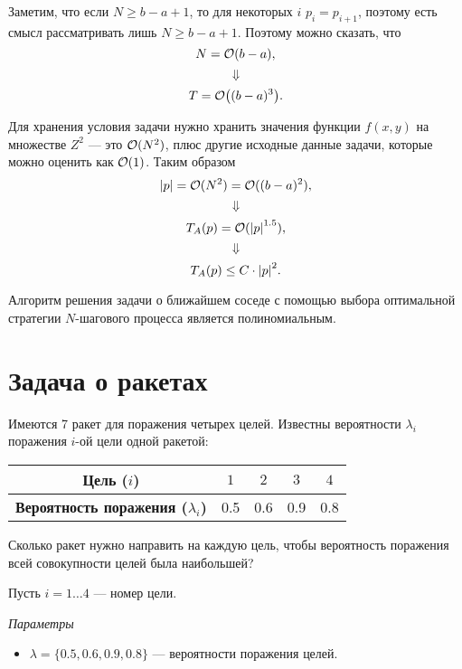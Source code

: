 Заметим, что если $N \ge b - a + 1$, то для некоторых $i$ $p_i = p_{i+1}$, поэтому есть смысл рассматривать лишь $N \ge b - a + 1$. Поэтому можно сказать, что
\[
N = \mathcal{O}(b - a),
\]
\[
\Downarrow
\]
\[
T = \mathcal{O}\big((b-a)^3\big). 
\]

Для хранения условия задачи нужно хранить значения функции $f(x, y)$ на множестве $Z^2$ --- это $\mathcal{O}(N^2)$, плюс другие исходные данные задачи, которые можно оценить как $\mathcal{O}(1)$. Таким образом
\[
\abs{p} = \mathcal{O}(N^2) = \mathcal{O}((b-a)^2),
\]
\[
\Downarrow
\]
\[
T_A(p) = \mathcal{O}(\abs{p}^{1.5}),
\]
\[
\Downarrow
\]
\[
T_A(p) \le C \cdot \abs{p}^2.
\]

\implication

Алгоритм решения задачи о ближайшем соседе с помощью выбора оптимальной стратегии $N$-шагового процесса является полиномиальным.

\section{Задача о ракетах}

\problem[о ракетах]\label{pr:rockets}

Имеются 7 ракет для поражения четырех целей. Известны вероятности $\lambda_i$ поражения $i$-ой цели одной ракетой: 

\begin{table}[H]
	\centering
	\begin{tabular}{| c | c | c | c | c |} 
		\hline
		\textbf{Цель ($i$)}             & $1$ & $2$ & $3$ & $4$ \\\hline
		\textbf{Вероятность поражения ($\lambda_i$)}              &0.5   & 0.6   & 0.9   & 0.8 \\\hline
	\end{tabular}
\end{table}

Сколько ракет нужно направить на каждую цель, чтобы вероятность поражения всей совокупности целей была наибольшей?

\mathmodel

Пусть $i = 1 \dots 4$ --- номер цели.

\bigskip

\textit{Параметры}

\begin{itemize}[nosep]
	\item $\lambda = \{0.5, 0.6, 0.9, 0.8\}$ --- вероятности поражения целей.
\end{itemize}

